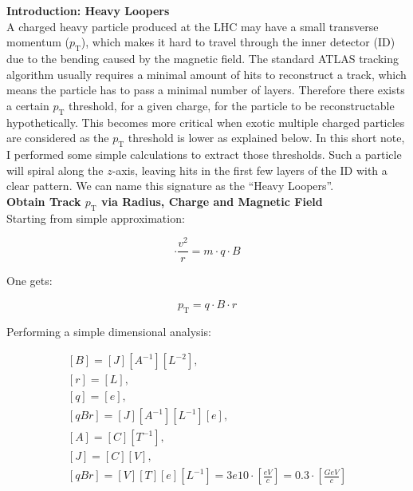 \documentclass[10pt,letterpaper]{article}
\begin{document}
 

\textbf{Introduction: Heavy Loopers} \\

A charged heavy particle produced at the LHC may have a small transverse
momentum ($p_{\mathrm{T}}$), which makes it hard to travel through the inner
detector (ID) due to the bending caused by the magnetic field. The standard
ATLAS tracking algorithm usually requires a minimal amount of hits to
reconstruct a track, which means the particle has to pass a minimal number of
layers.  Therefore there exists a certain $p_{\mathrm{T}}$ threshold, for a
given charge, for the particle to be reconstructable hypothetically. This
becomes more critical when exotic multiple charged particles are considered as
the $p_{\mathrm{T}}$ threshold is lower as explained below. In this short note,
I performed some simple calculations to extract those thresholds. Such a
particle will spiral along the $z$-axis, leaving hits in the first few layers
of the ID with a clear pattern. We can name this signature as the ``Heavy
Loopers''. \\ 

\textbf{Obtain Track $p_{\mathrm{T}}$ via Radius, Charge and Magnetic Field}\\

Starting from simple approximation: 

\begin{equation}
\cdot\frac{v^{2}}{r} = m\cdot q \cdot B
\label{equ:1}
\end{equation}

One gets:

\begin{equation}
p_{\mathrm{T}} = q\cdot B \cdot r
\label{equ:2}
\end{equation}

Performing a simple dimensional analysis:

\begin{equation}
\begin{gathered}
[B] = [J][A^{-1}][L^{-2}],\\  
[r] = [L],\\
[q] = [e],\\
[qBr] = [J][A^{-1}][L^{-1}][e], \\  
[A] = [C][T^{-1}],\\
[J] = [C][V],\\
[qBr] = [V][T][e][L^{-1}] = 3e10\cdot[\frac{eV}{c}] = 0.3\cdot[\frac{GeV}{c}] \\
\label{equ:3}
\end{gathered}
\end{equation}
\end{document}
